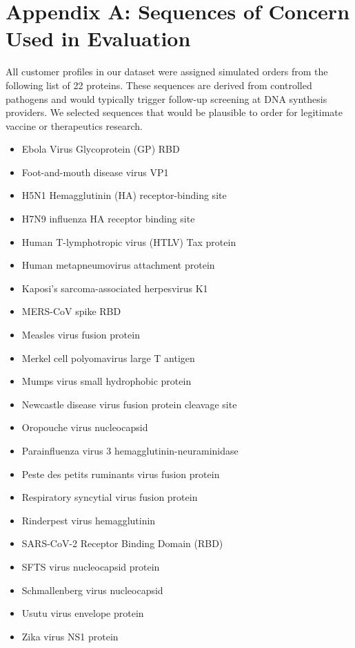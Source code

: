 \documentclass[utf8]{frontiers_suppmat}
\begin{document}
\onecolumn
{}

\title[Supplementary Material]{{}}

\maketitle

\section{Appendix A: Sequences of Concern Used in Evaluation}

All customer profiles in our dataset were assigned simulated orders from the following list of 22 proteins. These sequences are derived from controlled pathogens and would typically trigger follow-up screening at DNA synthesis providers. We selected sequences that would be plausible to order for legitimate vaccine or therapeutics research.

\begin{itemize}
\item Ebola Virus Glycoprotein (GP) RBD
\item Foot-and-mouth disease virus VP1
\item H5N1 Hemagglutinin (HA) receptor-binding site
\item H7N9 influenza HA receptor binding site
\item Human T-lymphotropic virus (HTLV) Tax protein
\item Human metapneumovirus attachment protein
\item Kaposi's sarcoma-associated herpesvirus K1
\item MERS-CoV spike RBD
\item Measles virus fusion protein
\item Merkel cell polyomavirus large T antigen
\item Mumps virus small hydrophobic protein
\item Newcastle disease virus fusion protein cleavage site
\item Oropouche virus nucleocapsid
\item Parainfluenza virus 3 hemagglutinin-neuraminidase
\item Peste des petits ruminants virus fusion protein
\item Respiratory syncytial virus fusion protein
\item Rinderpest virus hemagglutinin
\item SARS-CoV-2 Receptor Binding Domain (RBD)
\item SFTS virus nucleocapsid protein
\item Schmallenberg virus nucleocapsid
\item Usutu virus envelope protein
\item Zika virus NS1 protein
\end{itemize}
\end{document}
